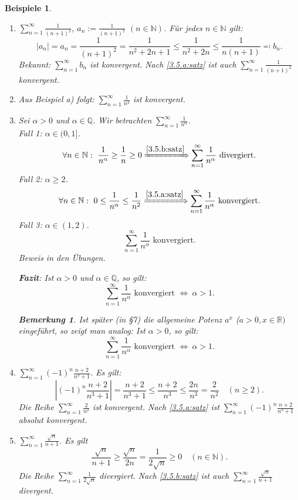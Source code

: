 \documentclass[12pt]{extreport} %
\newcommand{\N}{\mathbb{N}}
\newcommand{\Q}{\mathbb{Q}}
\newcommand{\R}{\mathbb{R}}
\theoremstyle{named}
\theoremstyle{itshape}
\theoremstyle{normal}
\newtheorem*{beispiele}{Beispiele}
\newtheorem*{bemerkung}{Bemerkung}
\begin{document}
\begin{beispiele} ~\
	\begin{enumerate}
		\item $\sum_{n=1}^{\infty} \frac{1}{(n+1)^{2}}$, $a_n:= \frac{1}{(n+1)^{2}}$ $(n \in \N)$. F\"ur jedes $n \in \N$ gilt:
			$$ |a_{n}| = a_n = \frac{1}{(n+1)^{2}} = \frac{1}{n^{2} + 2n +1} \leq \frac{1}{n^{2} + 2n} \leq \frac{1}{n(n+1)} \eqqcolon b_{n}. $$
			Bekannt: $\sum_{n=1}^{\infty} b_{n}$ ist konvergent. Nach \ref{3.5.a:satz} ist auch $\sum_{n=1}^{\infty} \frac{1}{(n+1)^{2}}$ konvergent.
		\item Aus Beispiel a) folgt: $\sum_{n=1}^{\infty} \frac{1}{n^{2}}$ ist konvergent.
		\item Sei $\alpha > 0$ und $\alpha \in \Q$. Wir betrachten $\sum_{n=1}^{\infty} \frac{1}{n^{\alpha}}$. \\
			Fall 1: $\alpha \in (0, 1]$. 
				$$ \forall n \in \N: ~ \frac{1}{n^{\alpha}} \geq \frac{1}{n} \geq 0 \xRightarrow[]{\ref{3.5.b:satz}} 
				\sum_{n=1}^{\infty} \frac{1}{n^{\alpha}} \text{ divergiert.} $$
			Fall 2: $\alpha \geq 2$.
				$$ \forall n \in \N: ~ 0 \leq \frac{1}{n^{\alpha}} \leq \frac{1}{n^{2}} \xRightarrow[]{\ref{3.5.a:satz}} 
				\sum_{n=1}^{\infty} \frac{1}{n^{\alpha}} \text{ konvergiert.} $$
			Fall 3: $\alpha \in (1, 2)$. 
			        $$
			        \sum_{n=1}^{\infty} \frac{1}{n^{\alpha}} \text{ konvergiert}.
			        $$
			        Beweis in den Übungen. 
			
			\textbf{Fazit}: Ist $\alpha > 0$ und $\alpha \in \Q$, so gilt: 
			$$
			\sum_{n=1}^{\infty} \frac{1}{n^{\alpha}} \text{ konvergiert } \Leftrightarrow ~ \alpha > 1.
			$$
			\begin{bemerkung}
	                Ist später (in \S 7) die allgemeine Potenz $a^{x}$ ($a > 0, x \in \R)$ eingeführt, so zeigt man analog:
	                Ist $\alpha > 0$, so gilt:
	                $$
			\sum_{n=1}^{\infty} \frac{1}{n^{\alpha}} \text{ konvergiert } \Leftrightarrow ~ \alpha > 1.
			$$	                
                        \end{bemerkung}
		\item $\sum_{n=1}^{\infty} (-1)^{n} \frac{n + 2}{n^{3} + 1}$. Es gilt:		
		$$
		\left|(-1)^{n} \frac{n + 2}{n^{3} + 1} \right| = \frac{n+2}{n^{3} + 1} \leq \frac{n+2}{n^{3}} \leq \frac{2n}{n^{3}} = \frac{2}{n^{2}} \quad (n \ge 2).
		$$
		Die Reihe $\sum_{n=1}^{\infty} \frac{2}{n^{2}}$ ist konvergent. Nach \ref{3.5.a:satz} ist $\sum_{n=1}^{\infty} (-1)^{n} \frac{n + 2}{n^{3} + 1}$ absolut konvergent. 
		\item $\sum_{n=1}^{\infty} \frac{\sqrt{n}}{n+1}$. Es gilt
		$$
		\frac{\sqrt{n}}{n+1} \geq \frac{\sqrt{n}}{2n} = \frac{1}{2\sqrt{n}} \geq 0 \quad (n \in \N).
		$$
		Die Reihe $\sum_{n=1}^{\infty} \frac{1}{2\sqrt{n}}$ divergiert. Nach \ref{3.5.b:satz} ist auch $\sum_{n=1}^{\infty} \frac{\sqrt{n}}{n+1}$ divergent.
	\end{enumerate}		
\end{beispiele}
\end{document}
